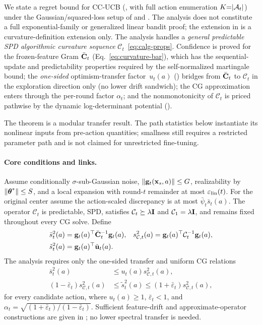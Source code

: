 \documentclass[twoside]{article}
\newcommand{\Calg}{\mathcal{C}}                 %
\begin{document}
We state a regret bound for CC-UCB (, with full action
enumeration $K{=}|\mathcal{A}_t|$) under the Gaussian/squared-loss setup of
 and
.
The analysis does not constitute a full exponential-family or generalized
linear bandit proof; the extension in  is a
curvature-definition extension only.
The analysis handles a \emph{general predictable SPD algorithmic curvature
sequence} $\Calg_t$~\eqref{eq:calg-props}.  Confidence is proved for the
frozen-feature Gram $\bar{\mathbf{C}}_t$ (Eq.~\ref{eq:curvature-bar}), which has the
sequential-update and predictability properties required by the
self-normalized martingale bound; the \emph{one-sided} optimism-transfer
factor~$u_t(a)$ () bridges from $\bar{\mathbf{C}}_t$ to $\Calg_t$
in the exploration direction only (no lower drift sandwich); the CG
approximation enters through the per-round factor $\alpha_t$; and the
nonmonotonicity of $\Calg_t$ is priced pathwise by the dynamic
log-determinant potential ().

The theorem is a modular transfer result.  The path statistics below instantiate
its nonlinear inputs from pre-action quantities; smallness still requires a
restricted parameter path and is not claimed for unrestricted fine-tuning.

\paragraph{Core conditions and links.}
Assume conditionally $\sigma$-sub-Gaussian noise, $\|\mathbf{g}_t(\mathbf{x}_s,a)\|\le G$,
realizability by $\|\boldsymbol{\theta}^*\|\le S$, and a local expansion with round-$t$
remainder at most $\varepsilon_{\mathrm{lin}}(t)$.  For the original center assume the
action-scaled discrepancy is at most $\bar\psi_t\bar s_t(a)$.  The operator
$\Calg_t$ is predictable, SPD, satisfies $\Calg_t\succeq\lambda\bI$ and
$\Calg_1=\lambda\bI$, and remains fixed throughout every CG solve.  Define
\begin{equation}\label{eq:main-widths}
\begin{aligned}
 \bar s_t^2(a)&=\bg_t(a)^\top\bCbar_t^{-1}\bg_t(a),&
 s_{\Calg,t}^2(a)&=\bg_t(a)^\top\Calg_t^{-1}\bg_t(a),\\
 \tilde s_t^2(a)&=\bg_t(a)^\top\tilde\bu_t(a).&&
\end{aligned}
\end{equation}
The analysis requires only the one-sided transfer and uniform CG relations
\begin{equation}\label{eq:main-transfer-cg}
\begin{aligned}
 \bar s_t^2(a)&\le u_t(a)s_{\Calg,t}^2(a),\\
 (1-\bar\varepsilon_t)s_{\Calg,t}^2(a)&\le\tilde s_t^2(a)
 \le(1+\bar\varepsilon_t)s_{\Calg,t}^2(a),
\end{aligned}
\end{equation}
for every candidate action, where $u_t(a)\ge1$, $\bar\varepsilon_t<1$, and
$\alpha_t=\sqrt{(1+\bar\varepsilon_t)/(1-\bar\varepsilon_t)}$.  Sufficient
feature-drift and approximate-operator constructions are given in
; no lower spectral transfer is
needed.
\end{document}
